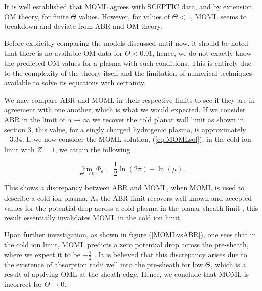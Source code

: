 \documentclass{article}
\begin{document}
\smallskip

It is well established that MOML agrees with SCEPTIC data, and by extension OM theory,
for finite $\Theta$ values. However, for values of $\Theta < 1$, MOML seems to breakdown and deviate 
from ABR and OM theory. 

\smallskip

Before explicitly comparing the models discussed until now, it should be noted that 
there is no available OM data for $\Theta < 0.01$, hence, we do not exactly know the predicted OM
values for a plasma with such conditions. This is entirely due to the complexity
of the theory itself and the limitation of numerical techniques available to solve its equations
with certainty. 

\smallskip

We may compare ABR and MOML in their respective limits to see if they are in 
agreement with one another, which is what we would expected.
If we consider ABR in the limit of $\alpha \to \infty$ we recover the cold planar
wall limit as shown in section 3, this value, for a singly charged hydrogenic plasma, is approximately $-3.34$. If we now consider
the MOML solution, (\ref{eq:MOMLsol}), in the cold ion limit with $Z = 1$, we attain the following

\begin{equation}\label{eq:OMLLim}
\lim_{\Theta \to 0} \Phi_{a} = \frac{1}{2}\ln{\left(2 \pi \right)} - \ln{\left(\mu \right)}.
\end{equation}

\smallskip

This shows a discrepancy between ABR and MOML, when MOML is used to
describe a cold ion plasma. As the ABR limit recovers well known and accepted values for
the potential drop across a cold plasma in the planar sheath limit \cite{Stangeby1986} \cite{Stangeby2000}, this result essentially
invalidates MOML in the cold ion limit.

\medskip

Upon further investigation, as shown in figure (\ref{MOMLvsABR}), one sees that in the cold ion limit, MOML
predicts a zero potential drop across the pre-sheath, where we expect it to be $-\frac{1}{2}$ \cite{Stangeby1986}.
It is believed that this discrepancy arises due to the existence of absorption radii well into
the pre-sheath for low $\Theta$, which is a result of applying OML at the sheath edge. 
Hence, we conclude that MOML is incorrect for $\Theta \to 0$.
\end{document}
